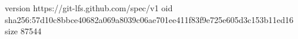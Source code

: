 version https://git-lfs.github.com/spec/v1
oid sha256:57d10c8bbce40682a069a8039c06ae701ee411f83f9e725e605d3c153b11ed16
size 87544
